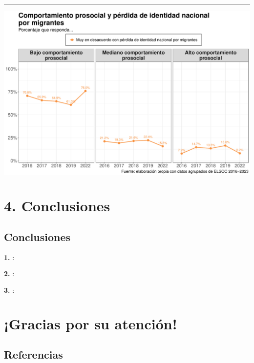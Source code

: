 \documentclass[
  spanish,
  letterpaper,
  DIV=11,
  numbers=noendperiod,
  oneside]{scrartcl}
\begin{document}
\begin{center}\rule{0.5\linewidth}{0.5pt}\end{center}

\begin{center}
\includegraphics[width=1\linewidth,height=\textheight,keepaspectratio]{cep_2025_files/figure-pdf/unnamed-chunk-12-1.pdf}
\end{center}

\section{4. Conclusiones}\label{conclusiones}

\subsection{Conclusiones}\label{conclusiones-1}

\textbf{1. }:

\textbf{2. }:

\textbf{3. }:

\section{¡Gracias por su atención!}\label{gracias-por-su-atenciuxf3n}

\subsection{Referencias}\label{referencias}
\end{document}
